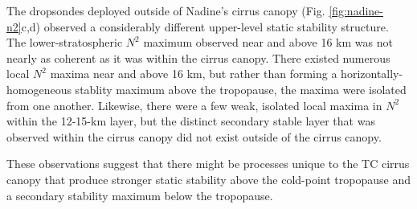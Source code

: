 The dropsondes deployed outside of Nadine's cirrus canopy (Fig. \ref{fig:nadine-n2}c,d) observed a considerably different upper-level static stability structure.
The lower-stratospheric $N^2$ maximum observed near and above 16 km was not nearly as coherent as it was within the cirrus canopy.
There existed numerous local $N^2$ maxima near and above 16 km, but rather than forming a horizontally-homogeneous stablity maximum above the tropopause, the maxima were isolated from one another.
Likewise, there were a few weak, isolated local maxima in $N^2$ within the 12-15-km layer, but the distinct secondary stable layer that was observed within the cirrus canopy did not exist outside of the cirrus canopy.

These observations suggest that there might be processes unique to the TC cirrus canopy that produce stronger static stability above the cold-point tropopause and a secondary stability maximum below the tropopause.

